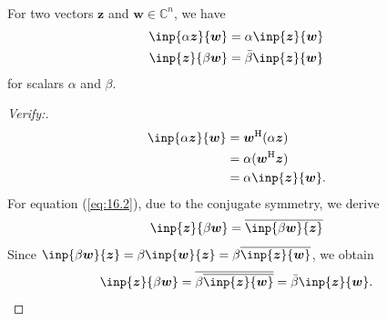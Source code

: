 \begin{proposition}[Sesquilinear]\qquad\\
For two vectors $\bm z$ and $\bm w\in\mathbb{C}^{n}$, we have
\begin{gather}
\inp{\alpha\bm z}{\bm w}=\alpha\inp{\bm z}{\bm w}\\
\inp{\bm z}{\beta\bm w}=\bar\beta\inp{\bm z}{\bm w}\label{eq:16.2}
\end{gather}
for scalars $\alpha$ and $\beta$.
\end{proposition}
\begin{proof}[Verify:]
\begin{align*}
\inp{\alpha\bm z}{\bm w}&=\bm w\Her(\alpha\bm z)\\&=\alpha(\bm w\Her\bm z)\\&=\alpha\inp{\bm z}{\bm w}.
\end{align*}
For equation (\ref{eq:16.2}), due to the conjugate symmetry, we derive
\[
\inp{\bm z}{\beta\bm w}=\overline{\inp{\beta\bm w}{\bm z}}
\]
Since $\inp{\beta\bm w}{\bm z}=\beta\inp{\bm w}{\bm z}=\beta\overline{\inp{\bm z}{\bm w}}$, we obtain
\[
\inp{\bm z}{\beta\bm w}=\overline{\beta\overline{\inp{\bm z}{\bm w}}}=\bar\beta\inp{\bm z}{\bm w}.
\]
\end{proof}
